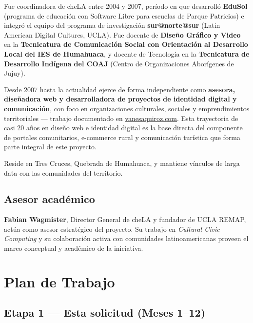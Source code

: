 \documentclass[12pt,a4paper]{article}
\begin{document}
Fue coordinadora de cheLA entre 2004 y 2007, período en que desarrolló \textbf{EduSol} (programa de educación con Software Libre para escuelas de Parque Patricios) e integró el equipo del programa de investigación \textbf{sur@norte@sur} (Latin American Digital Cultures, UCLA). Fue docente de \textbf{Diseño Gráfico y Video} en la \textbf{Tecnicatura de Comunicación Social con Orientación al Desarrollo Local del IES de Humahuaca}, y docente de Tecnología en la \textbf{Tecnicatura de Desarrollo Indígena del COAJ} (Centro de Organizaciones Aborígenes de Jujuy).

Desde 2007 hasta la actualidad ejerce de forma independiente como \textbf{asesora, diseñadora web y desarrolladora de proyectos de identidad digital y comunicación}, con foco en organizaciones culturales, sociales y emprendimientos territoriales --- trabajo documentado en \href{https://vanesaquiroz.com}{vanesaquiroz.com}. Esta trayectoria de casi 20 años en diseño web e identidad digital es la base directa del componente de portales comunitarios, e-commerce rural y comunicación turística que forma parte integral de este proyecto.

Reside en Tres Cruces, Quebrada de Humahuaca, y mantiene vínculos de larga data con las comunidades del territorio.

\subsection{Asesor académico}

\textbf{Fabian Wagmister}, Director General de cheLA y fundador de UCLA REMAP, actúa como asesor estratégico del proyecto. Su trabajo en \textit{Cultural Civic Computing} y su colaboración activa con comunidades latinoamericanas proveen el marco conceptual y académico de la iniciativa.

\section{Plan de Trabajo}

\subsection{Etapa 1 — Esta solicitud (Meses 1--12)}
\end{document}
